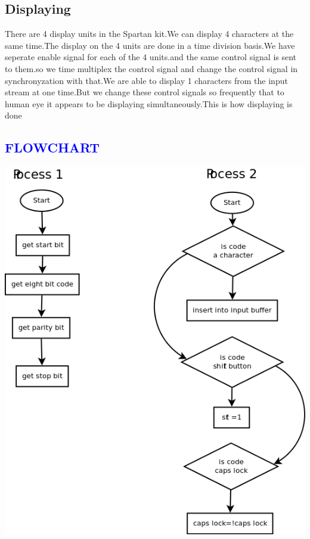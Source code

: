 \documentclass[a4paper,12pt]{report}
\begin{document}
\section*{Displaying }
\noindent There are 4 display units in the Spartan kit.We can display 4 characters at the same time.The display on the 4
units are done in a time division basis.We have seperate enable signal for each of the 4 units.and the same control signal is 
sent to them.so we time multiplex the control signal and change the control signal in synchronyzation with that.We
are able to display 1 characters from the input stream at one time.But we change these control signals  so frequently that 
to human eye it appears to be displaying simultaneously.This is how displaying is done \\


\begin{center}
\chapter{\textcolor{blue}{FLOWCHART}}
\begin{center}
 \includegraphics[scale=0.5]{./flowchart.png}
\end{center}

\end{center}
\end{document}
